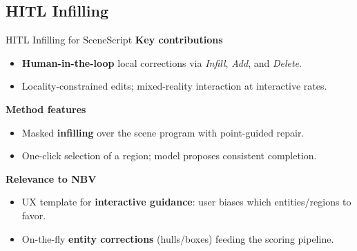 \documentclass[10pt,aspectratio=169]{beamer}
\begin{document}
\subsection{HITL Infilling}
\begin{frame}{HITL Infilling for SceneScript}
\textbf{Key contributions}~\cite{HITL-SceneScript-xie2025}
\begin{itemize}
  \item \textbf{Human-in-the-loop} local corrections via \emph{Infill}, \emph{Add}, and \emph{Delete}.
  \item Locality-constrained edits; mixed-reality interaction at interactive rates.
\end{itemize}
\textbf{Method features}
\begin{itemize}
  \item Masked \textbf{infilling} over the scene program with point-guided repair.
  \item One-click selection of a region; model proposes consistent completion.
\end{itemize}
\textbf{Relevance to NBV}
\begin{itemize}
  \item UX template for \textbf{interactive guidance}: user biases which entities/regions to favor.
  \item On-the-fly \textbf{entity corrections} (hulls/boxes) feeding the scoring pipeline.
\end{itemize}
\end{frame}
\end{document}
